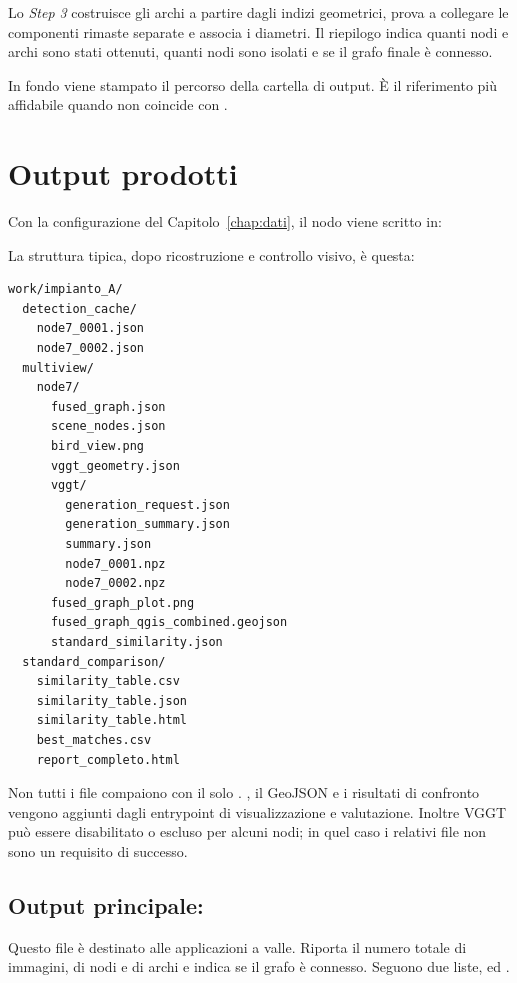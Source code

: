 Lo \emph{Step 3} costruisce gli archi a partire dagli indizi geometrici, prova a
collegare le componenti rimaste separate e associa i diametri. Il riepilogo
 indica quanti nodi e archi sono stati ottenuti, quanti nodi
sono isolati e se il grafo finale è connesso.

In fondo viene stampato il percorso della cartella di output. È il riferimento
più affidabile quando  non coincide con
.

\section{Output prodotti}

Con la configurazione del Capitolo~\ref{chap:dati}, il nodo  viene
scritto in:

\begin{center}
\end{center}

La struttura tipica, dopo ricostruzione e controllo visivo, è questa:

\begin{lstlisting}[language={}]
work/impianto_A/
  detection_cache/
    node7_0001.json
    node7_0002.json
  multiview/
    node7/
      fused_graph.json
      scene_nodes.json
      bird_view.png
      vggt_geometry.json
      vggt/
        generation_request.json
        generation_summary.json
        summary.json
        node7_0001.npz
        node7_0002.npz
      fused_graph_plot.png
      fused_graph_qgis_combined.geojson
      standard_similarity.json
  standard_comparison/
    similarity_table.csv
    similarity_table.json
    similarity_table.html
    best_matches.csv
    report_completo.html
\end{lstlisting}

Non tutti i file compaiono con il solo .
, il GeoJSON e i risultati di confronto vengono
aggiunti dagli entrypoint di visualizzazione e valutazione. Inoltre VGGT può
essere disabilitato o escluso per alcuni nodi; in quel caso i relativi file non
sono un requisito di successo.

\subsection{Output principale: }

Questo file è destinato alle applicazioni a valle. Riporta il
numero totale di immagini, di nodi e di archi e indica se il grafo è connesso.
Seguono due liste,  ed .

